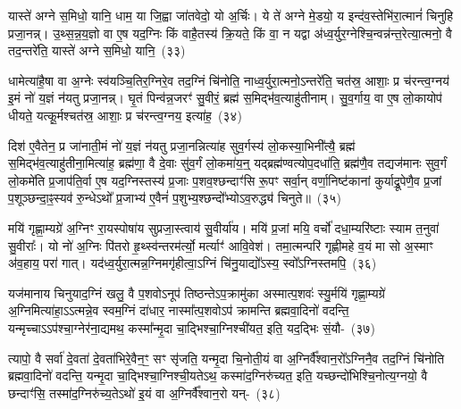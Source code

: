 {\anuvakamend[{आ॒गच्छा॒त्तद्व्या॑न॒शुस्तेने॒मं य॒ज्ञं नो॑ वह॒ सुव॑र्दे॒वेषु॒ गन्त॑वे॒ चतु॑र्दश च}]}

यास्ते॑ अग्ने स॒मिधो॒ यानि॒ धाम॒ या जि॒ह्वा जा॑तवेदो॒ यो अ॒र्चिः। ये ते॑ अग्ने मे॒डयो॒ य इन्द॑व॒स्तेभि॑रा॒त्मानं॑ चिनुहि प्रजा॒नन्न्। उ॒थ्स॒न्न॒य॒ज्ञो वा ए॒ष यद॒ग्निः किं वाहै॒तस्य॑ क्रि॒यते॒ किं वा॒ न यद्वा अ॑ध्व॒र्युर॒ग्नेश्चि॒न्वन्न॑न्त॒रेत्या॒त्मनो॒ वै तद॒न्तरे॑ति॒ यास्ते॑ अग्ने स॒मिधो॒ यानि॒~(३३)\ip

धामेत्या॑है॒षा वा अ॒ग्नेः स्व॑यञ्चि॒तिर॒ग्निरे॒व तद॒ग्निं चि॑नोति॒ नाध्व॒र्युरा॒त्मनो॒\-ऽन्तरे॑ति॒ चत॑स्र॒ आशाः॒ प्र च॑रन्त्व॒ग्नय॑ इ॒मं नो॑ य॒ज्ञं न॑यतु प्रजा॒नन्न्। घृ॒तं पिन्व॑न्न॒जरꣳ॑ सु॒वीरं॒ ब्रह्म॑ स॒मिद्भ॑व॒त्याहु॑तीनाम्। सु॒व॒र्गाय॒ वा ए॒ष लो॒कायोप॑ धीयते॒ यत्कू॒र्मश्चत॑स्र॒ आशाः॒ प्र च॑रन्त्व॒ग्नय॒ इत्या॑ह॒~(३४)\ip

दिश॑ ए॒वैतेन॒ प्र जा॑नाती॒मं नो॑ य॒ज्ञं न॑यतु प्रजा॒नन्नित्या॑ह सुव॒र्गस्य॑ लो॒कस्या॒भिनी᳚त्यै॒ ब्रह्म॑ स॒मिद्भ॑व॒त्याहु॑तीना॒मित्या॑ह॒ ब्रह्म॑णा॒ वै दे॒वाः सु॑व॒र्गं लो॒कमा॑य॒न्॒ यद्ब्रह्म॑ण्वत्योप॒\-दधा॑ति॒ ब्रह्म॑णै॒व तद्यज॑मानः सुव॒र्गं लो॒कमे॑ति प्र॒जा\-प॑ति॒र्वा ए॒ष यद॒ग्निस्तस्य॑ प्र॒जाः प॒शव॒श्छन्दाꣳ॑सि रू॒पꣳ सर्वा॒न् वर्णा॒निष्ट॑कानां कुर्याद्रू॒पेणै॒व प्र॒जां प॒शूञ्छन्दा॒ꣴ॒स्यव॑ रु॒न्धे\-ऽथो᳚ प्र॒जाभ्य॑ ए॒वैनं॑ प॒शुभ्य॒श्छन्दो᳚भ्यो\-ऽव॒रुद्ध्य॑ चिनुते॥~(३५)\ip

{\anuvakamend[{यान्य॒ग्नय॒ इत्या॒हेष्ट॑काना॒ꣳ॒ षोड॑श च}]}

मयि॑ गृह्णा॒म्यग्रे॑ अ॒ग्निꣳ रा॒यस्पोषा॑य सुप्रजा॒स्त्वाय॑ सु॒वीर्या॑य। मयि॑ प्र॒जां मयि॒ वर्चो॑ दधा॒म्यरि॑ष्टाः स्याम त॒नुवा॑ सु॒वीराः᳚। यो नो॑ अ॒ग्निः पि॑तरो हृ॒थ्स्व॑न्तरम॑र्त्यो॒ मर्त्याꣳ॑ आवि॒वेश॑। तमा॒त्मन्परि॑ गृह्णीमहे व॒यं मा सो अ॒स्माꣳ अ॑व॒हाय॒ परा॑ गात्। यद॑ध्व॒र्युरा॒त्मन्न॒ग्निमगृ॑हीत्वा॒\-ऽग्निं चि॑नु॒याद्यो᳚\-ऽस्य॒ स्वो᳚\-ऽग्निस्तमपि॒~(३६)\ip

यज॑मानाय चिनुयाद॒ग्निं खलु॒ वै प॒शवो\-ऽनूप॑ तिष्ठन्ते\-ऽप॒क्रामु॑का अस्मात्प॒शवः॑ स्यु॒र्मयि॑ गृह्णा॒म्यग्रे॑ अ॒ग्निमित्या॑हा॒\-ऽऽत्मन्ने॒व स्वम॒ग्निं दा॑धार॒ नास्मा᳚त्प॒शवो\-ऽप॑ क्रामन्ति ब्रह्मवा॒दिनो॑ वदन्ति॒ यन्मृच्चा\-ऽऽप॑श्चा॒ग्नेर॑ना॒द्यमथ॒ कस्मा᳚न्मृ॒दा चा॒द्भिश्चा॒ग्निश्ची॑यत॒ इति॒ यद॒द्भिः सं॒यौ-~(३७)\ip

त्यापो॒ वै सर्वा॑ दे॒वता॑ दे॒वता॑भिरे॒वैन॒ꣳ॒ सꣳ सृ॑जति॒ यन्मृ॒दा चि॒नोती॒यं वा अ॒ग्निर्वै᳚श्वान॒रो᳚\-ऽग्निनै॒व तद॒ग्निं चि॑नोति ब्रह्मवा॒दिनो॑ वदन्ति॒ यन्मृ॒दा चा॒द्भिश्चा॒ग्निश्ची॒यते\-ऽथ॒ कस्मा॑द॒ग्निरु॑च्यत॒ इति॒ यच्छन्दो॑भिश्चि॒नोत्य॒ग्नयो॒ वै छन्दाꣳ॑सि॒ तस्मा॑द॒ग्निरु॑च्य॒ते\-ऽथो॑ इ॒यं वा अ॒ग्निर्वै᳚श्वान॒रो यन्-~(३८)\ip

